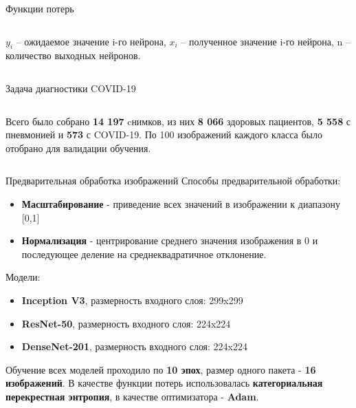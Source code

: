 \documentclass[aspectratio=169]{beamer}
\begin{document}
\begin{frame}{Функции потерь}
    
    \begin{columns}[T]
        \begin{column}{.8\paperwidth}
            $y_i$ – ожидаемое значение i-го нейрона, $x_i$ – полученное значение i-го нейрона, n – количество выходных нейронов.
        \end{column}
    \end{columns}   
\end{frame}

\begin{frame}{Задача диагностики COVID-19}
    \begin{columns}[T]
        \begin{column}{.8\paperwidth}            
            Всего было собрано \textbf{14 197} cнимков, из них \textbf{8 066} здоровых пациентов, \textbf{5 558} с пневмонией и \textbf{573} с COVID-19. По 100 изображений каждого класса было отобрано для валидации обучения.    
        \end{column}
    \end{columns}  
\end{frame}

\begin{frame}{Предварительная обработка изображений}
    Способы предварительной обработки:
    \begin{itemize}    
        \item \textbf{Масштабирование} - приведение всех значений в изображении к диапазону [0,1]
        \item \textbf{Нормализация} - центрирование среднего значения изображения в 0 и последующее деление на среднеквадратичное отклонение.
    \end{itemize}    
    Модели:
    \begin{itemize}
        \item \textbf{Inception V3}, размерность входного слоя: 299x299
        \item \textbf{ResNet-50}, размерность входного слоя: 224x224
        \item \textbf{DenseNet-201}, размерность входного слоя:  224x224
    \end{itemize} 
    Обучение всех моделей проходило по \textbf{10 эпох}, размер одного пакета - \textbf{16 изображений}. В качестве функции потерь использовалась \textbf{категориальная перекрестная энтропия}, в качестве оптимизатора - \textbf{Adam}. 
\end{frame}
\end{document}
